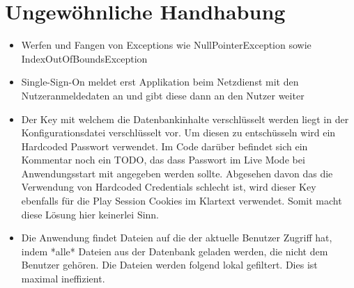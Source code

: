 \documentclass[12pt,DIV14,BCOR10mm,a4paper,parskip=half-,headsepline,headinclude,english,ngerman,bibliography=totocnumbered]{scrreprt}
\begin{document}
\chapter{Ungewöhnliche Handhabung}

\begin{itemize}
  \item Werfen und Fangen von Exceptions wie NullPointerException sowie IndexOutOfBoundsException
  \item Single-Sign-On meldet erst Applikation beim Netzdienst mit den Nutzeranmeldedaten an und gibt diese dann an den Nutzer weiter
  \item Der Key mit welchem die Datenbankinhalte verschlüsselt werden liegt in der Konfigurationsdatei verschlüsselt vor. Um diesen zu entschüsseln wird ein Hardcoded Passwort verwendet. Im Code darüber befindet sich ein Kommentar noch ein TODO, das dass Passwort im Live Mode bei Anwendungsstart mit angegeben werden sollte. Abgesehen davon das die Verwendung von Hardcoded Credentials schlecht ist, wird dieser Key ebenfalls für die Play Session Cookies im Klartext verwendet. Somit macht diese Lösung hier keinerlei Sinn.
  \item Die Anwendung findet Dateien auf die der aktuelle Benutzer Zugriff hat, indem *alle* Dateien aus der Datenbank geladen werden, die nicht dem Benutzer gehören. Die Dateien werden folgend lokal gefiltert. Dies ist maximal ineffizient.
\end{itemize}

\printbibliography

\printacronyms[title=Abkürzungsverzeichnis,toctitle=Abkürzungsverzeichnis]
\printglossary[title=Glossar,toctitle=Glossar,type=main]

\iftotalfigures
  \listoffigures
\fi

\end{document}
